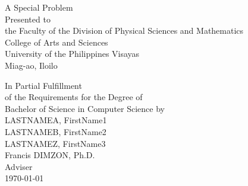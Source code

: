 \begin{titlepage}
\centering


\vspace{0.875cm}
A Special Problem\\
Presented to\\
the Faculty of the Division of Physical Sciences and Mathematics\\
College of Arts and Sciences\\
University of the Philippines Visayas\\
Miag-ao, Iloilo

\vspace{0.875cm}
In Partial Fulfillment\\
of the Requirements for the Degree of\\
Bachelor of Science in Computer Science
\vspace{1.75cm}
by\\

\vspace{0.1cm}
LASTNAMEA, FirstName1  \\
LASTNAMEB, FirstName2  \\
LASTNAMEZ, FirstName3  \\

\vspace{0.875cm}
Francis DIMZON, Ph.D. \\
Adviser\\


\vspace{0.875cm}
\today
\end{titlepage}
